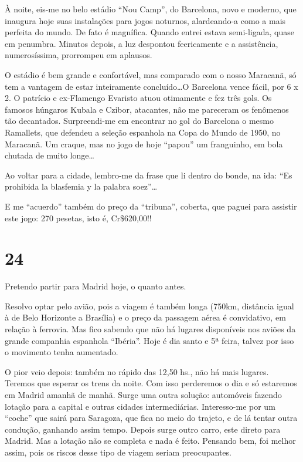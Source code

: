 À noite, eis-me no belo estádio ``Nou Camp'', do Barcelona, novo e moderno, que inaugura hoje suas instalações para jogos noturnos, alardeando-a como a mais perfeita do mundo. De fato é magnífica. Quando entrei estava semi-ligada, quase em penumbra. Minutos depois, a luz despontou feericamente e a assistência, numerosíssima, prorrompeu em aplausos.

O estádio é bem grande e confortável, mas comparado com o nosso Maracanã, só tem a vantagem de estar inteiramente concluído\ldots O Barcelona vence fácil, por 6 x 2. O patrício e ex-Flamengo Evaristo atuou otimamente e fez três gols. Os famosos húngaros Kubala e Czibor, atacantes, não me pareceram os fenômenos tão decantados. Surpreendi-me em encontrar no gol do Barcelona o mesmo Ramallets, que defendeu a seleção espanhola na Copa do Mundo de 1950, no Maracanã. Um craque, mas no jogo de hoje ``papou'' um franguinho, em bola chutada de muito longe\ldots

Ao voltar para a cidade, lembro-me da frase que li dentro do bonde, na ida: ``Es prohibida la blasfemia y la palabra soez''\ldots

E me ``acuerdo'' também do preço da ``tribuna'', coberta, que paguei para assistir este jogo: 270 pesetas, isto é, Cr\$620,00!!

\section*{24 \adfflatleafright {}}
Pretendo partir para Madrid hoje, o quanto antes.

Resolvo optar pelo avião, pois a viagem é também longa (750km, distância igual à de Belo Horizonte a Brasília) e o preço da passagem aérea é convidativo, em relação à ferrovia. Mas fico sabendo que não há lugares disponíveis nos aviões da grande companhia espanhola ``Ibéria''. Hoje é dia santo e 5ª feira, talvez por isso o movimento tenha aumentado.

O pior veio depois: também no rápido das 12,50 hs., não há mais lugares. Teremos que esperar os trens da noite. Com isso perderemos o dia e só estaremos em Madrid amanhã de manhã. Surge uma outra solução: automóveis fazendo lotação para a capital e outras cidades intermediárias. Interesso-me por um ``coche'' que sairá para Saragoza, que fica no meio do trajeto, e de lá tentar outra condução, ganhando assim tempo. Depois surge outro carro, este direto para Madrid. Mas a lotação não se completa e nada é feito. Pensando bem, foi melhor assim, pois os riscos desse tipo de viagem seriam preocupantes.

